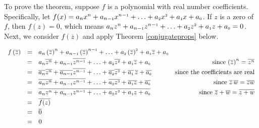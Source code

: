 \smallskip

To prove the theorem, suppose $f$ is a polynomial with real number coefficients.  Specifically, let 
$ f(x) = a_{n} x^{n} + a_{n-\mbox{\tiny$1$}} x^{n-\mbox{\tiny$1$}} + \ldots + a_{\mbox{\tiny $2$}} x^{\mbox{\tiny $2$}} + a_{\mbox{\tiny $1$}} x + a_{\mbox{\tiny $0$}}$.  If $z$ is a zero of $f$, then $f(z) = 0$, which means $a_{n} z^{n} + a_{n-\mbox{\tiny$1$}} z^{n-\mbox{\tiny$1$}} + \ldots + a_{\mbox{\tiny $2$}} z^{\mbox{\tiny $2$}} + a_{\mbox{\tiny $1$}} z + a_{\mbox{\tiny $0$}} = 0$.  Next, we consider $f\left(\overline{z}\right)$ and apply Theorem \ref{conjugateprops} below.

\[ \begin{array}{rclr}

 f\left(\overline{z}\right) & = &  a_{n} \left(\overline{z}\right)^{n} + a_{n-\mbox{\tiny$1$}} \left(\overline{z}\right)^{n-\mbox{\tiny$1$}} + \ldots + a_{\mbox{\tiny $2$}}\left( \overline{z}\right)^{\mbox{\tiny $2$}} + a_{\mbox{\tiny $1$}} \overline{z} + a_{\mbox{\tiny $0$}} & \\ [3pt]
 
 &  = & a_{n}\overline{z^{n}} + a_{n-\mbox{\tiny$1$}}\overline{z^{n-\mbox{\tiny$1$}}} + \ldots + a_{\mbox{\tiny $2$}}\overline{z^{\mbox{\tiny $2$}}} + a_{\mbox{\tiny $1$}} \overline{z} + a_{\mbox{\tiny $0$}} & \mbox{ since $\left(\overline{z}\right)^n = \overline{z^{n}}$}\\ [3pt]
 
 & = & \overline{a_{n}}\overline{z^{n}} + \overline{a_{n-\mbox{\tiny$1$}}}\overline{z^{n-\mbox{\tiny$1$}}} + \ldots +  \overline{a_{\mbox{\tiny $2$}}}\overline{z^{\mbox{\tiny $2$}}} + \overline{a_{\mbox{\tiny $1$}}}\, \overline{z} + \overline{a_{\mbox{\tiny $0$}}} & \mbox{since the coefficients are real} \\ [3pt]
 
 & = & \overline{a_{n} z^{n}} + \overline{a_{n-\mbox{\tiny$1$}} z^{n-\mbox{\tiny$1$}}} + \ldots +  \overline{a_{\mbox{\tiny $2$}} z^{\mbox{\tiny $2$}}} + \overline{a_{\mbox{\tiny $1$}} z} + \overline{a_{\mbox{\tiny $0$}}} &  \mbox{ since $\overline{z} \, \overline{w}=\overline{zw} $}\\ [3pt]
 
 & = & \overline{a_{n} z^{n} + a_{n-\mbox{\tiny$1$}} z^{n-\mbox{\tiny$1$}} + \ldots + a_{\mbox{\tiny $2$}} z^{\mbox{\tiny $2$}} + a_{\mbox{\tiny $1$}} z + a_{\mbox{\tiny $0$}}} & \mbox{ since $ \overline{z} + \overline{w} = \overline{z+w} $}\\ [3pt]
 
 & = & \overline{f(z)} & \\ [3pt]
 
 & = & \overline{0} & \\ [3pt]
 
 & = & 0 & \\
 
\end{array} \]

